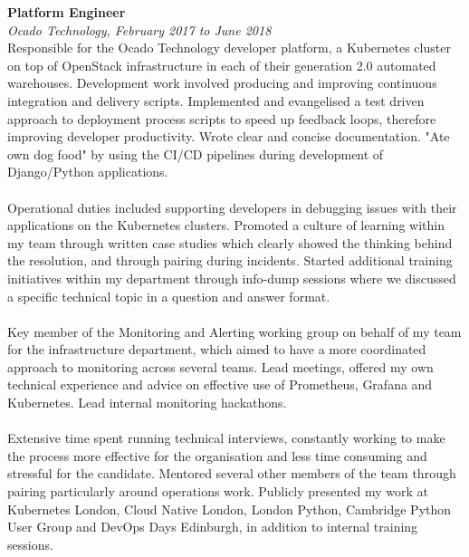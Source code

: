 \documentclass{article}
\begin{document}
\begin{flushleft}
\textbf{Platform Engineer}\\
\textit{Ocado Technology, February 2017 to June 2018}\\[5pt]
Responsible for the Ocado Technology developer platform, a Kubernetes cluster on top of OpenStack infrastructure in each of their generation 2.0 automated warehouses. Development work involved producing and improving continuous integration and delivery scripts. Implemented and evangelised a test driven approach to deployment process scripts to speed up feedback loops, therefore improving developer productivity. Wrote clear and concise documentation. "Ate own dog food" by using the CI/CD pipelines during development of Django/Python applications.

\paragraph{}Operational duties included supporting developers in debugging issues with their applications on the Kubernetes clusters. Promoted a culture of learning within my team through written case studies which clearly showed the thinking behind the resolution, and through pairing during incidents. Started additional training initiatives within my department through info-dump sessions where we discussed a specific technical topic in a question and answer format.

\paragraph{}Key member of the Monitoring and Alerting working group on behalf of my team for the infrastructure department, which aimed to have a more coordinated approach to monitoring across several teams. Lead meetings, offered my own technical experience and advice on effective use of Prometheus, Grafana and Kubernetes. Lead internal monitoring hackathons.

\paragraph{}Extensive time spent running technical interviews, constantly working to make the process more effective for the organisation and less time consuming and stressful for the candidate. Mentored several other members of the team through pairing particularly around operations work. Publicly presented my work at Kubernetes London, Cloud Native London, London Python, Cambridge Python User Group and DevOps Days Edinburgh, in addition to internal training sessions.\\[10pt]


\end{flushleft}
\end{document}
